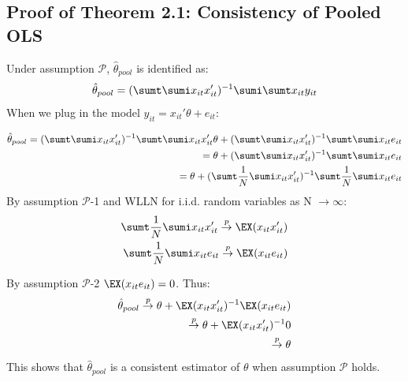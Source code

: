 \subsection{Proof of Theorem 2.1: Consistency of Pooled OLS}

Under assumption $\mathcal{P}$, $\hat\theta_{pool}$ is identified as:
\begin{align*}
    \hat\theta_{pool} = (\sumt \sumi  x_{it}x_{it}')^{-1}\sumi\sumt x_{it}y_{it}
\end{align*}
When we plug in the model $y_{it} =  x_{it}'\theta + e_{it}$:

\begin{align*}
    \hat\theta_{pool} = (\sumt \sumi x_{it}x_{it}')^{-1}\sumt\sumi x_{it}x_{it}'\theta + (\sumt \sumi x_{it}x_{it}')^{-1} \sumt \sumi  x_{it}e_{it} \\
    = \theta + (\sumt \sumi x_{it}x_{it}')^{-1} \sumt \sumi x_{it}e_{it}\\
    = \theta + (\sumt \dfrac{1}{N} \sumi  x_{it}x_{it}')^{-1} \sumt \dfrac{1}{N} \sumi x_{it}e_{it}
\end{align*}
By assumption $\mathcal{P}$-1 and WLLN for i.i.d. random variables as N $\rightarrow \infty$:
\begin{align*}
\sumt \dfrac{1}{N} \sumi x_{it}x_{it}'  \overset{p}{\to} \EX(x_{it}x_{it}') \\
\sumt \dfrac{1}{N} \sumi x_{it}e_{it}  \overset{p}{\to} \EX(x_{it}e_{it}) 
\end{align*}

By assumption $\mathcal{P}$-2 $\EX(x_{it}e_{it}) = 0$.
Thus:
\begin{align*}
 \hat\theta_{pool} \overset{p}{\to} \theta + \EX(x_{it}x_{it}')^{-1}  \EX(x_{it}e_{it})\\
 \overset{p}{\to} \theta + \EX(x_{it}x_{it}')^{-1}0\\
 \overset{p}{\to} \theta 
\end{align*}
This shows that $\hat\theta_{pool}$ is a consistent estimator of $\theta$ when assumption $\mathcal{P}$ holds. 